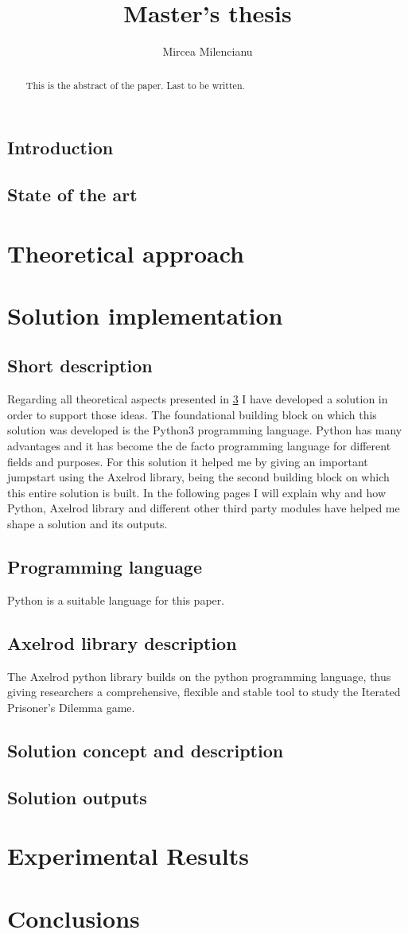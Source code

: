 \documentclass[11pt, oneside, leqno, a4paper]{report}   	%
\title{Master's thesis}
\author{Mircea Milencianu}
\begin{document}
\maketitle
\begin{abstract}
This is the abstract of the paper. Last to be written.
\end{abstract}

\tableofcontents
\newpage
\thispagestyle{empty}
\section{Introduction} 
\section{State of the art} \label{sota}
\chapter{Theoretical approach} \label{theappr}
\chapter{Solution implementation} \label{solimpl}
\section{Short description} 
Regarding all theoretical aspects presented in  \cref{theappr} I have developed a solution in order to support those ideas. The foundational building block on which this solution was developed is the Python3 programming language.
Python has many advantages and it has become the de facto programming language for different fields and purposes. For this solution it helped me by giving an important jumpstart using the Axelrod library, being the second building block on which this entire solution is built. 
In the following pages I will explain why and how Python, Axelrod library and different other third party modules have helped me shape a solution and its outputs.
\section{Programming language} \label{progrlang}
Python is a suitable language for this paper.
\section{Axelrod library description} \label{axellib}
The Axelrod python library builds on the python programming language, thus giving researchers a comprehensive, flexible and stable tool to study the Iterated Prisoner's Dilemma game.
\section{Solution concept and description} \label{solcandd}
\section{Solution outputs} \label{solout}
\chapter{Experimental Results} \label{results}
\chapter{Conclusions} \label{concl}


\printbibliography
%
%
\end{document}

